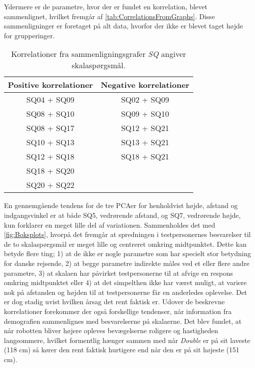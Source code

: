%
Ydermere er de parametre, hvor der er fundet en korrelation, blevet sammenlignet, hvilket fremgår af \autoref{tab:CorrelationsFromGraphs}. Disse sammenligninger er foretaget på alt data, hvorfor der ikke er blevet taget højde for grupperinger.
%
\begin{table}[H]
	\centering
	\begin{tabular}{ c|c }
		\centering
		Positive korrelationer & Negative korrelationer \\ \hline
		SQ04 + SQ09 & SQ02 + SQ09 \\ 
		SQ08 + SQ10 & SQ09 + SQ10 \\ 
		SQ08 + SQ17 & SQ12 + SQ21 \\ 
		SQ10 + SQ13 & SQ13 + SQ21 \\ 
		SQ12 + SQ18 & SQ18 + SQ21	\\	
		SQ18 + SQ20 & 							\\
		SQ20 + SQ22 & 
	\end{tabular}        
\caption{Korrelationer fra sammenligningsgrafer \textit{SQ} angiver skalaspørgsmål.}
\label{tab:CorrelationsFromGraphs} 
\end{table}
\noindent
%
En gennemgående tendens for de tre PCAer for henholdvist højde, afstand og indgangsvinkel er at både SQ5, vedrørende afstand, og SQ7, vedrørende højde, kun forklarer en meget lille del af variationen. Sammenholdes det med \autoref{fig:Boksplots}, hvorpå det fremgår at spredningen i testpersonernes besvarelser til de to skalaspørgsmål er meget lille og centreret omkring midtpunktet. Dette kan betyde flere ting; 1) at de ikke er nogle parametre som har specielt stor betydning for danske rejsende, 2) at begge parametre indirekte måles ved et eller flere andre parametre, 3) at skalaen har påvirket testpersonerne til at afvige en respons omkring midtpunktet eller 4) at det simpelthen ikke har været muligt, at variere nok på afstanden og højden til at testpersonerne får en anderledes oplevelse. Det er dog stadig uvist hvilken årsag det rent faktisk er.\blankline  
%
Udover de beskrevne korrelationer forekommer der også forskellige tendenser, når information fra demografien sammenlignes med besvarelserne på skalaerne. Det blev fundet, at når robotten bliver højere opleves bevægelserne roligere og hastigheden langsommere, hvilket formentlig hænger sammen med når \textit{Double} er på sit laveste (118 cm) så kører den rent faktisk hurtigere end når den er på sit højeste (151 cm). 

